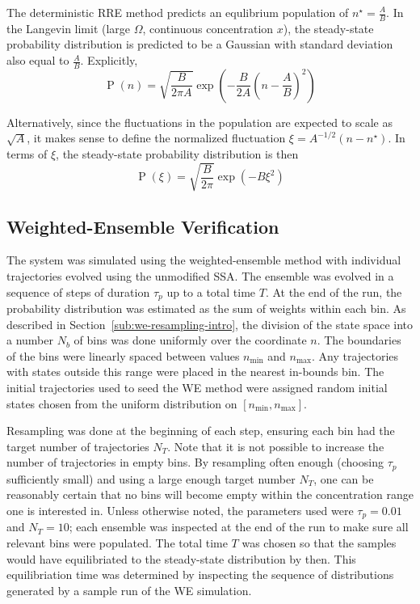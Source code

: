 \documentclass[english,letterpaper,12pt]{article}
\DeclareMathOperator{\Prob}{P}
\begin{document}
\begin{doublespacing}
The deterministic RRE method predicts an equlibrium population of $n^\star = \frac{A}{B}$. In the Langevin limit (large $\Omega$, continuous concentration $x$), the steady-state probability distribution is predicted to be a Gaussian with standard deviation also equal to $\frac{A}{B}$. Explicitly,
\begin{equation}
    \Prob(n) = \sqrt{\frac{B}{2\pi A}}\exp\left( -\frac{B}{2 A} \left( n - \frac{A}{B} \right)^2  \right)
    \label{eq:prod-deg-dist}
\end{equation}

Alternatively, since the fluctuations in the population are expected to scale as $\sqrt{A}$, it makes sense to define the normalized fluctuation $\xi = A^{-1/2}(n - n^\star)$. In terms of $\xi$, the steady-state probability distribution is then
\begin{equation}
    \Prob(\xi) = \sqrt{\frac{B}{2\pi}} \exp(-B \xi^2)
    \label{eq:pd-dist-xi}
\end{equation}

\subsection{Weighted-Ensemble Verification} %
\label{sub:pd-we-verif}

The system was simulated using the weighted-ensemble method with individual trajectories evolved using the unmodified SSA. The ensemble was evolved in a sequence of steps of duration $\tau_p$ up to a total time $T$. At the end of the run, the probability distribution was estimated as the sum of weights within each bin. As described in Section~\ref{sub:we-resampling-intro}, the division of the state space into a number $N_b$ of bins was done uniformly over the coordinate $n$. The boundaries of the bins were linearly spaced between values $n_\text{min}$ and $n_\text{max}$. Any trajectories with states outside this range were placed in the nearest in-bounds bin. The initial trajectories used to seed the WE method were assigned random initial states chosen from the uniform distribution on $[n_\text{min}, n_\text{max}]$.

Resampling was done at the beginning of each step, ensuring each bin had the target number of trajectories $N_T$. Note that it is not possible to increase the number of trajectories in empty bins. By resampling often enough (choosing $\tau_p$ sufficiently small) and using a large enough target number $N_T$, one can be reasonably certain that no bins will become empty within the concentration range one is interested in. Unless otherwise noted, the parameters used were $\tau_p = 0.01$ and $N_T = 10$; each ensemble was inspected at the end of the run to make sure all relevant bins were populated. The total time $T$ was chosen so that the samples would have equilibriated to the steady-state distribution by then. This equilibriation time was determined by inspecting the sequence of distributions generated by a sample run of the WE simulation.


\end{doublespacing}
\end{document}
